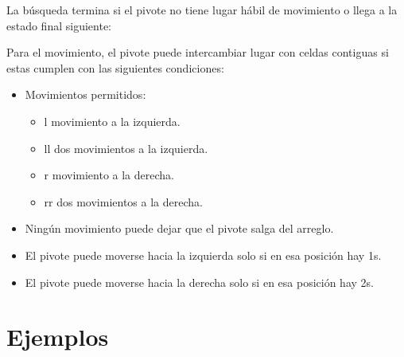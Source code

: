 \documentclass[letterpaper]{article}
\begin{document}

La búsqueda termina si el pivote no tiene lugar hábil de movimiento o llega a la
estado final siguiente:


Para el movimiento, el pivote puede intercambiar lugar con celdas contiguas si estas
cumplen con las siguientes condiciones:

\begin{itemize}
    \item Movimientos permitidos:
        \begin{itemize}
            \item l movimiento a la izquierda.
            \item ll dos movimientos a la izquierda.
            \item r movimiento a la derecha.
            \item rr dos movimientos a la derecha.
        \end{itemize}
    \item Ningún movimiento puede dejar que el pivote salga del arreglo.
    \item El pivote puede moverse hacia la izquierda solo si en esa posición hay 1s.
    \item El pivote puede moverse hacia la derecha solo si en esa posición hay 2s.
\end{itemize}

\section{Ejemplos}
\end{document}
